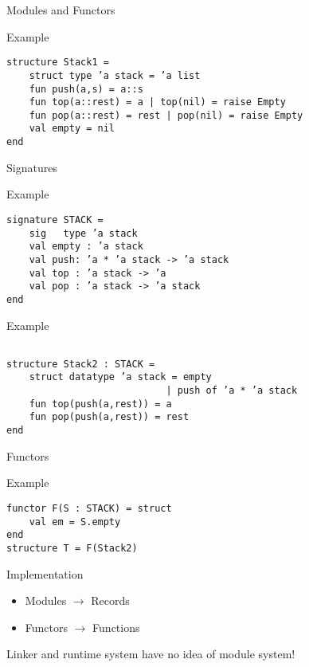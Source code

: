\documentclass[presentation]{beamer}
\begin{document}
\begin{frame}[fragile]{Modules and Functors}
\begin{block}{Example}
\begin{verbatim}
structure Stack1 =
    struct type ’a stack = ’a list
    fun push(a,s) = a::s
    fun top(a::rest) = a | top(nil) = raise Empty
    fun pop(a::rest) = rest | pop(nil) = raise Empty
    val empty = nil
end
\end{verbatim}
\end{block}
\end{frame}

\begin{frame}[fragile]{Signatures}
  \begin{block}{Example}
\begin{verbatim}
signature STACK =
    sig   type ’a stack
    val empty : ’a stack
    val push: ’a * ’a stack -> ’a stack
    val top : ’a stack -> ’a
    val pop : ’a stack -> ’a stack
end
\end{verbatim}
  \end{block}
  \pause
  \begin{block}{Example}
\begin{verbatim}

structure Stack2 : STACK =
    struct datatype ’a stack = empty
                            | push of ’a * ’a stack
    fun top(push(a,rest)) = a
    fun pop(push(a,rest)) = rest
end
\end{verbatim}
  \end{block}
\end{frame}

\begin{frame}[fragile]{Functors}
  \begin{block}{Example}
\begin{verbatim}
functor F(S : STACK) = struct  
    val em = S.empty
end
structure T = F(Stack2)
\end{verbatim}
  \end{block}
\end{frame}

\begin{frame}{Implementation}
  \begin{itemize}
    \pause
\item{Modules $\rightarrow$ Records}
\item{Functors $\rightarrow$ Functions}
\end{itemize}
Linker and runtime system have no idea of module system!
\end{frame}
\end{document}
